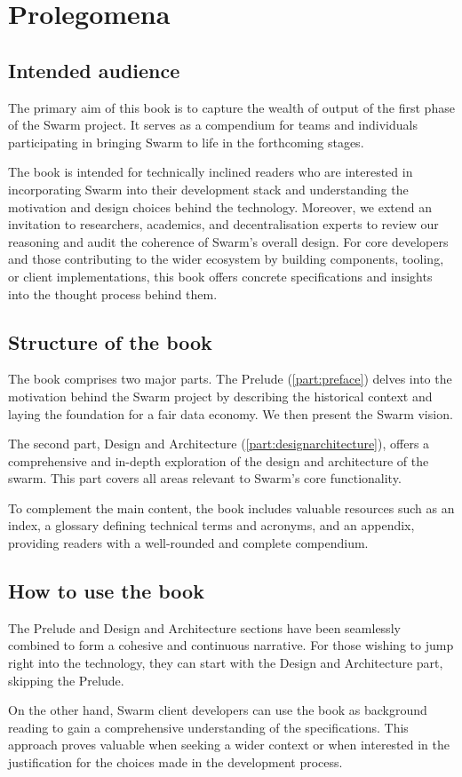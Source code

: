 \chapter{Prolegomena \statusgreen}
\green{}
\section*{Intended audience \statusgreen}
The primary aim of this book is to capture the wealth of output of the first phase of the Swarm project. It serves as a compendium for teams and individuals participating in bringing Swarm to life in the forthcoming stages.

The book is intended for technically inclined readers who are interested in incorporating Swarm into their development stack and understanding the motivation and design choices behind the technology. Moreover, we extend an invitation to researchers, academics, and decentralisation experts to review our reasoning and audit the coherence of Swarm's overall design. For core developers and those contributing to the wider ecosystem by building components, tooling, or client implementations, this book offers concrete specifications and insights into the thought process behind them.

\section*{Structure of the book \statusgreen}

The book comprises two major parts. The Prelude (\ref{part:preface}) delves into the motivation behind the Swarm project by describing the historical context and laying the foundation for a fair data economy. We then present the Swarm vision.

The second part, Design and Architecture (\ref{part:designarchitecture}), offers a comprehensive and in-depth exploration of the design and architecture of the swarm. This part covers all areas relevant to Swarm's core functionality.

To complement the main content, the book includes valuable resources such as an index, a glossary defining technical terms and acronyms, and an appendix, providing readers with a well-rounded and complete compendium.

\section*{How to use the book \statusgreen}

The Prelude and Design and Architecture sections have been seamlessly combined to form a cohesive and continuous narrative. For those wishing to jump right into the technology, they can start with the Design and Architecture part, skipping the Prelude.

On the other hand, Swarm client developers can use the book as background reading to gain a comprehensive understanding of the specifications. This approach proves valuable when seeking a wider context or when interested in the justification for the choices made in the development process.
